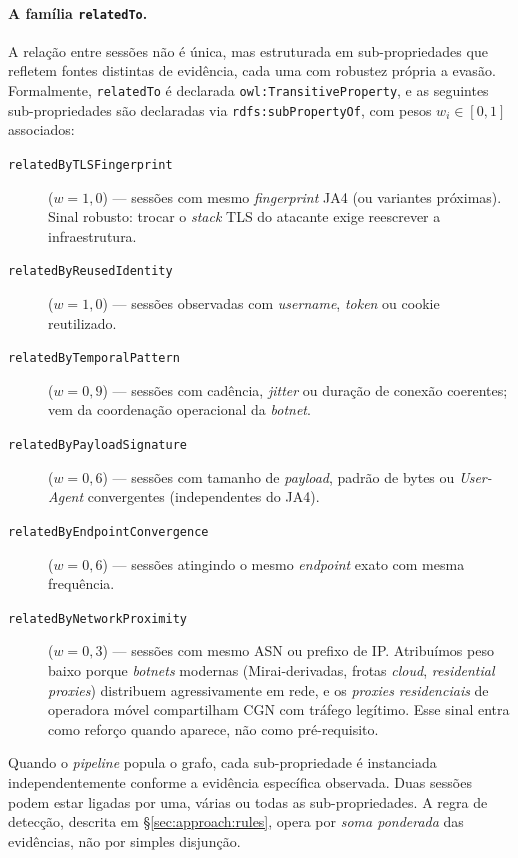 \documentclass[preprint,12pt]{elsarticle}
\begin{document}
\paragraph{A família \texttt{relatedTo}.} A relação entre sessões não é única, mas estruturada em sub-propriedades que refletem fontes distintas de evidência, cada uma com robustez própria a evasão. Formalmente, \texttt{relatedTo} é declarada \texttt{owl:TransitiveProperty}, e as seguintes sub-propriedades são declaradas via \texttt{rdfs:subPropertyOf}, com pesos $w_i \in [0, 1]$ associados:

\begin{description}
    \item[\texttt{relatedByTLSFingerprint}] ($w = 1{,}0$) --- sessões com mesmo \emph{fingerprint} JA4 (ou variantes próximas). Sinal robusto: trocar o \emph{stack} TLS do atacante exige reescrever a infraestrutura.
    \item[\texttt{relatedByReusedIdentity}] ($w = 1{,}0$) --- sessões observadas com \emph{username}, \emph{token} ou cookie reutilizado.
    \item[\texttt{relatedByTemporalPattern}] ($w = 0{,}9$) --- sessões com cadência, \emph{jitter} ou duração de conexão coerentes; vem da coordenação operacional da \emph{botnet}.
    \item[\texttt{relatedByPayloadSignature}] ($w = 0{,}6$) --- sessões com tamanho de \emph{payload}, padrão de bytes ou \emph{User-Agent} convergentes (independentes do JA4).
    \item[\texttt{relatedByEndpointConvergence}] ($w = 0{,}6$) --- sessões atingindo o mesmo \emph{endpoint} exato com mesma frequência.
    \item[\texttt{relatedByNetworkProximity}] ($w = 0{,}3$) --- sessões com mesmo ASN ou prefixo de IP. Atribuímos peso baixo porque \emph{botnets} modernas (Mirai-derivadas, frotas \emph{cloud}, \emph{residential proxies}) distribuem agressivamente em rede, e os \emph{proxies residenciais} de operadora móvel compartilham CGN com tráfego legítimo. Esse sinal entra como reforço quando aparece, não como pré-requisito.
\end{description}

Quando o \emph{pipeline} popula o grafo, cada sub-propriedade é instanciada independentemente conforme a evidência específica observada. Duas sessões podem estar ligadas por uma, várias ou todas as sub-propriedades. A regra de detecção, descrita em §\ref{sec:approach:rules}, opera por \emph{soma ponderada} das evidências, não por simples disjunção.
\end{document}
